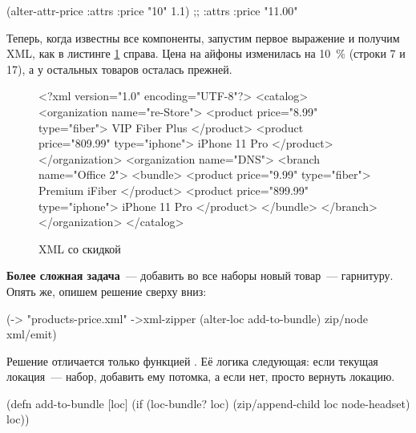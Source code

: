 \begin{english}
  \begin{clojure}
(alter-attr-price {:attrs {:price "10"}} 1.1)
;; {:attrs {:price "11.00"}}
  \end{clojure}
\end{english}

Теперь, когда известны все компоненты, запустим первое выражение и получим XML,
как в листинге \ref{fig:chart-xml-02} справа. Цена на айфоны изменилась на 10~\%
(строки 7 и 17), а у остальных товаров осталась прежней.

\begin{figure}[ht!]

\begin{english}
  \begin{xml/lines}
<?xml version="1.0" encoding="UTF-8"?>
<catalog>
  <organization name="re-Store">
    <product price="8.99" type="fiber">
      VIP Fiber Plus
    </product>
    <product price="809.99" type="iphone">
      iPhone 11 Pro
    </product>
  </organization>
  <organization name="DNS">
    <branch name="Office 2">
      <bundle>
        <product price="9.99" type="fiber">
          Premium iFiber
        </product>
        <product price="899.99" type="iphone">
          iPhone 11 Pro
        </product>
      </bundle>
    </branch>
  </organization>
</catalog>
  \end{xml/lines}
\end{english}

\captionsetup{labelformat=lis}
\caption{XML со скидкой}

\label{fig:chart-xml-02}

\end{figure}

\textbf{Более сложная задача}~--- добавить во все наборы новый товар~---
гарнитуру. Опять же, опишем решение сверху вниз:

\begin{english}
  \begin{clojure}
(-> "products-price.xml"
    ->xml-zipper
    (alter-loc add-to-bundle)
    zip/node
    xml/emit)
  \end{clojure}
\end{english}

Решение отличается только функцией . Её логика следующая: если
текущая локация~--- набор, добавить ему потомка, а если нет, просто вернуть
локацию.

\begin{english}
  \begin{clojure}
(defn add-to-bundle [loc]
  (if (loc-bundle? loc)
    (zip/append-child loc node-headset)
    loc))
  \end{clojure}
\end{english}

